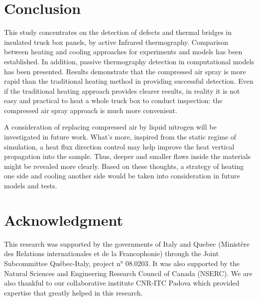 \documentclass{tQRT2e}
\begin{document}
\section{Conclusion}
This study concentrates on the detection of defects and thermal bridges in insulated truck box panels, by active Infrared thermography. Comparison between heating and cooling approaches for experiments and models has been established. In addition, passive thermography detection in computational models has been presented. Results demonstrate that the compressed air spray is more rapid than the traditional heating method in providing successful detection. Even if the traditional heating approach provides clearer results, in reality it is not easy and practical to heat a whole truck box to conduct inspection: the compressed air spray approach is much more convenient. 

A consideration of replacing compressed air by liquid nitrogen will be investigated in future work. What’s more, inspired from the static regime of simulation, a heat flux direction control may help improve the heat vertical propagation into the sample. Thus, deeper and smaller flaws inside the materials might be revealed more clearly. Based on these thoughts, a strategy of heating one side and cooling another side would be taken into consideration in future models and tests.


\section*{Acknowledgment}
This research was supported by the governments of Italy and Quebec (Ministère des Relations internationales et de la Francophonie) through the Joint Subcommittee Québec-Italy, project n° 08.0203. It was also supported by  the Natural Sciences and Engineering Research Council of Canada (NSERC). We are also thankful to our collaborative institute CNR-ITC Padova which provided expertise that greatly helped in this research. 



\end{document}
